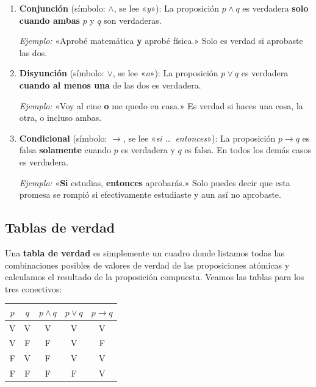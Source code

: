 \documentclass[12pt, a4paper]{article}
\begin{document}
\begin{cuadrosolucion}
\begin{enumerate}[label=\arabic*., leftmargin=*]
  \item \textbf{Conjunción} (símbolo: $\wedge$, se lee «\emph{y}»): La proposición $p \wedge q$ es verdadera \textbf{solo cuando ambas} $p$ y $q$ son verdaderas.
  
  \textit{Ejemplo:} «Aprobé matemática \textbf{y} aprobé física.» Solo es verdad si aprobaste las dos.

  \item \textbf{Disyunción} (símbolo: $\vee$, se lee «\emph{o}»): La proposición $p \vee q$ es verdadera \textbf{cuando al menos una} de las dos es verdadera.
  
  \textit{Ejemplo:} «Voy al cine \textbf{o} me quedo en casa.» Es verdad si haces una cosa, la otra, o incluso ambas.

  \item \textbf{Condicional} (símbolo: $\rightarrow$, se lee «\emph{si \ldots\ entonces}»): La proposición $p \rightarrow q$ es falsa \textbf{solamente} cuando $p$ es verdadera y $q$ es falsa. En todos los demás casos es verdadera.
  
  \textit{Ejemplo:} «\textbf{Si} estudias, \textbf{entonces} aprobarás.» Solo puedes decir que esta promesa se rompió si efectivamente estudiaste y aun así no aprobaste.
\end{enumerate}
\end{cuadrosolucion}

\subsection{Tablas de verdad}

Una \textbf{tabla de verdad} es simplemente un cuadro donde listamos todas las combinaciones posibles de valores de verdad de las proposiciones atómicas y calculamos el resultado de la proposición compuesta. Veamos las tablas para los tres conectivos:

\begin{center}
\begin{tabular}{cc|c|c|c}
\toprule
$p$ & $q$ & $p \wedge q$ & $p \vee q$ & $p \rightarrow q$ \\
\midrule
V & V & V & V & V \\
V & F & F & V & F \\
F & V & F & V & V \\
F & F & F & F & V \\
\bottomrule
\end{tabular}
\end{center}
\end{document}
